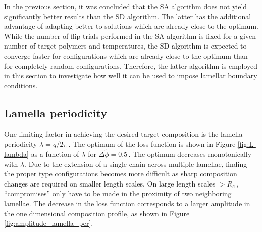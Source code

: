 \documentclass[bachelor,       %
               twoside,        %
               BCOR10mm,       %
               ngerman, english %
               ]{GAUBM}
\begin{document}
In the previous section, it was concluded that the \ac{SA} algorithm does not yield significantly better results than the \ac{SD} algorithm. The latter has the additional advantage of adapting better to solutions which are already close to the optimum. While the number of flip trials performed in the \ac{SA} algorithm is fixed for a given number of target polymers and temperatures, the \ac{SD} algorithm is expected to converge faster for configurations which are already close to the optimum than for completely random configurations. Therefore, the latter algorithm is employed in this section to investigate how well it can be used to impose lamellar boundary conditions.

\subsection{Lamella periodicity}

One limiting factor in achieving the desired target composition is the lamella periodicity $\lambda=q/2\pi\,.$ The optimum of the loss function is shown in Figure \ref{fig:L-lambda} as a function of $\lambda$ for $\Delta\tilde\phi=0.5\,.$ The optimum decreases monotonically with $\lambda.$ Due to the extension of a single chain across multiple lamellae, finding the proper type configurations becomes more difficult as sharp composition changes are required on smaller length scales. On large length scales $>R_e\,,$ \enquote{compromises} only have to be made in the proximity of two neighboring lamellae. The decrease in the loss function corresponds to a larger amplitude in the one dimensional composition profile, as shown in Figure \ref{fig:amplitude_lamella_per}. 
\end{document}
